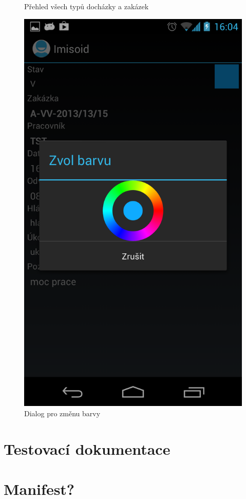 \documentclass{diplomka}
\begin{document}
\begin{figure}[H]
\begin{minipage}{.45\textwidth}
   \caption{Přehled všech typů docházky a zakázek}
  \label{fig:colors}
\end{minipage}\hfill%
\begin{minipage}{.45\textwidth}
   \centering
 \includegraphics[width=.9\linewidth]{scr/changecolor.png}
   \caption{Dialog pro změnu barvy}
  \label{fig:changecolor}
\end{minipage}
\end{figure}


\chapter{Testovací dokumentace}

\chapter{Manifest?}
\end{document}
